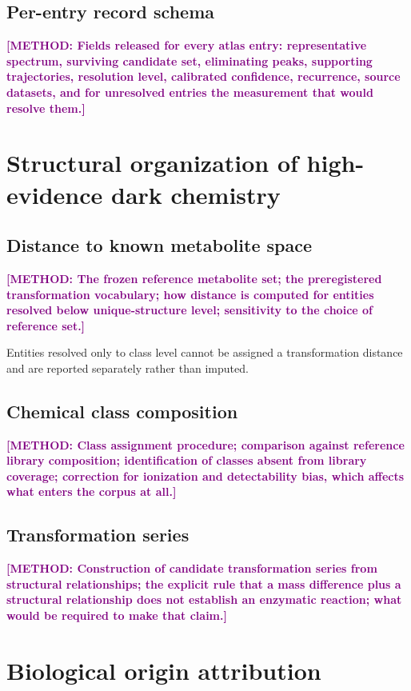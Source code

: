 \documentclass[12pt]{article}
\newcommand{\methodtodo}[1]{\textbf{\textcolor{purple}{[METHOD: #1]}}}
\begin{document}
\subsection{Per-entry record schema}
\methodtodo{Fields released for every atlas entry: representative spectrum, surviving candidate set, eliminating peaks, supporting trajectories, resolution level, calibrated confidence, recurrence, source datasets, and for unresolved entries the measurement that would resolve them.}

\section{Structural organization of high-evidence dark chemistry}

\subsection{Distance to known metabolite space}
\methodtodo{The frozen reference metabolite set; the preregistered transformation vocabulary; how distance is computed for entities resolved below unique-structure level; sensitivity to the choice of reference set.}

Entities resolved only to class level cannot be assigned a transformation distance and are reported separately rather than imputed.

\subsection{Chemical class composition}
\methodtodo{Class assignment procedure; comparison against reference library composition; identification of classes absent from library coverage; correction for ionization and detectability bias, which affects what enters the corpus at all.}

\subsection{Transformation series}
\methodtodo{Construction of candidate transformation series from structural relationships; the explicit rule that a mass difference plus a structural relationship does not establish an enzymatic reaction; what would be required to make that claim.}

\section{Biological origin attribution}
\end{document}
